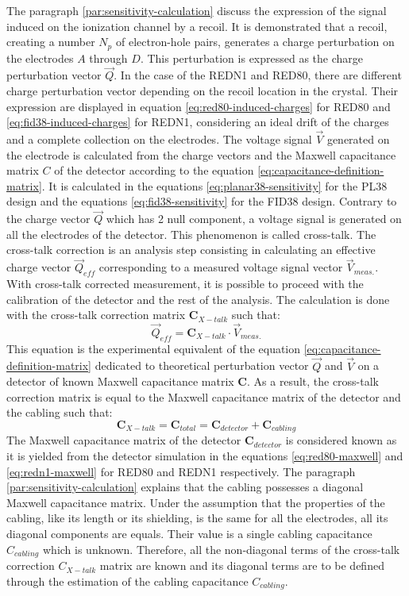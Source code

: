 The paragraph \ref{par:sensitivity-calculation} discuss the expression of the signal induced on the ionization channel by a recoil. It is demonstrated that a recoil, creating a number $N_p$ of electron-hole pairs, generates a charge perturbation on the electrodes $A$ through $D$. This perturbation is expressed as the charge perturbation vector $\vec{Q}$. In the case of the REDN1 and RED80, there are different charge perturbation vector depending on the recoil location in the crystal. Their expression are displayed in equation \ref{eq:red80-induced-charges} for RED80 and \ref{eq:fid38-induced-charges} for REDN1, considering an ideal drift of the charges and a complete collection on the electrodes.
The voltage signal $\vec{V}$ generated on the electrode is calculated from the charge vectors and the Maxwell capacitance matrix $C$ of the detector according to the equation \ref{eq:capacitance-definition-matrix}. It is calculated in the equations \ref{eq:planar38-sensitivity} for the PL38 design and the equations \ref{eq:fid38-sensitivity} for the FID38 design. Contrary to the charge vector $\vec{Q}$ which has 2 null component, a voltage signal is generated on all the electrodes of the detector. This phenomenon is called cross-talk.
The cross-talk correction is an analysis step consisting in calculating an effective charge vector $\vec{Q}_{eff}$ corresponding to a measured voltage signal vector $\vec{V}_{meas.}$. With cross-talk corrected measurement, it is possible to proceed with the calibration of the detector and the rest of the analysis.
The calculation is done with the cross-talk correction matrix $\bm{C}_{X-talk}$ such that:
\begin{equation}
\vec{Q}_{eff} = \bm{C}_{X-talk} \cdot \vec{V}_{meas.}
\end{equation}
This equation is the experimental equivalent of the equation \ref{eq:capacitance-definition-matrix} dedicated to theoretical perturbation vector $\vec{Q}$ and $\vec{V}$ on a detector of known Maxwell capacitance matrix $\bm{C}$. As a result, the cross-talk correction matrix is equal to the Maxwell capacitance matrix of the detector and the cabling such that:
\begin{equation}
\bm{C}_{X-talk} = \bm{C}_{total} = \bm{C}_{detector} + \bm{C}_{cabling} 
\end{equation}
The Maxwell capacitance matrix of the detector $\bm{C}_{detector}$ is considered known as it is yielded from the detector simulation in the equations \ref{eq:red80-maxwell} and \ref{eq:redn1-maxwell} for RED80 and REDN1 respectively.
The paragraph \ref{par:sensitivity-calculation} explains that the cabling possesses a diagonal Maxwell capacitance matrix. Under the assumption that the properties of the cabling, like its length or its shielding, is the same for all the electrodes, all its diagonal components are equals. Their value is a single cabling capacitance $C_{cabling}$ which is unknown.
Therefore, all the non-diagonal terms of the cross-talk correction $C_{X-talk}$ matrix are known and its diagonal terms are to be defined through the estimation of the cabling capacitance $C_{cabling}$.

